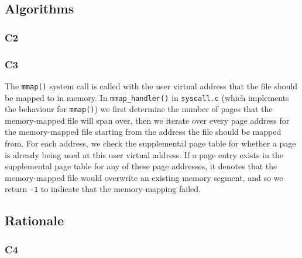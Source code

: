 \documentclass[a4wide, 11pt]{article}
\newcommand{\tx}{\texttt}
\begin{document}
\subsection{Algorithms}
\subsubsection{C2}

\subsubsection{C3}

The \tx{mmap()} system call is called with the user virtual address that the file should be mapped to in memory. In \tx{mmap\_handler()} in \tx{syscall.c} (which implements the behaviour for \tx{mmap()}) we first determine the number of pages that the memory-mapped file will span over, then we iterate over every page address for the memory-mapped file starting from the address the file should be mapped from. For each address, we check the supplemental page table for whether a page is already being used at this user virtual address. If a page entry exists in the supplemental page table for any of these page addresses, it denotes that the memory-mapped file would overwrite an existing memory segment, and so we return \tx{-1} to indicate that the memory-mapping failed.

\subsection{Rationale}
\subsubsection{C4}
\end{document}
